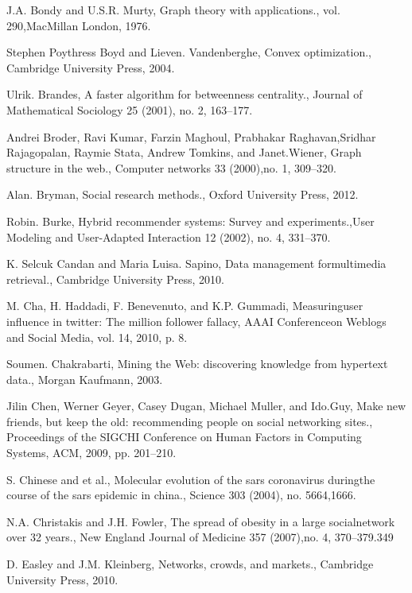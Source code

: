 \begin{thebibliography}{999}
 J.A. Bondy and U.S.R. Murty, Graph theory with applications., vol. 290,MacMillan London, 1976.

 Stephen Poythress Boyd and Lieven. Vandenberghe, Convex optimization., Cambridge University Press, 2004.

 Ulrik. Brandes, A faster algorithm for betweenness centrality., Journal of Mathematical Sociology 25 (2001), no. 2, 163–177.

 Andrei Broder, Ravi Kumar, Farzin Maghoul, Prabhakar Raghavan,Sridhar Rajagopalan, Raymie Stata, Andrew Tomkins, and Janet.Wiener, Graph structure in the web., Computer networks 33 (2000),no. 1, 309–320.

 Alan. Bryman, Social research methods., Oxford University Press, 2012.

 Robin. Burke, Hybrid recommender systems: Survey and experiments.,User Modeling and User-Adapted Interaction 12 (2002), no. 4, 331–370.

 K. Selcuk Candan and Maria Luisa. Sapino, Data management formultimedia retrieval., Cambridge University Press, 2010.

 M. Cha, H. Haddadi, F. Benevenuto, and K.P. Gummadi, Measuringuser influence in twitter: The million follower fallacy, AAAI Conferenceon Weblogs and Social Media, vol. 14, 2010, p. 8.

 Soumen. Chakrabarti, Mining the Web: discovering knowledge from hypertext data., Morgan Kaufmann, 2003.

 Jilin Chen, Werner Geyer, Casey Dugan, Michael Muller, and Ido.Guy, Make new friends, but keep the old: recommending people on social networking sites., Proceedings of the SIGCHI Conference on Human Factors in Computing Systems, ACM, 2009, pp. 201–210.

 S. Chinese and et al., Molecular evolution of the sars coronavirus duringthe course of the sars epidemic in china., Science 303 (2004), no. 5664,1666.

 N.A. Christakis and J.H. Fowler, The spread of obesity in a large socialnetwork over 32 years., New England Journal of Medicine 357 (2007),no. 4, 370–379.349

 D. Easley and J.M. Kleinberg, Networks, crowds, and markets., Cambridge University Press, 2010.


\end{thebibliography}
